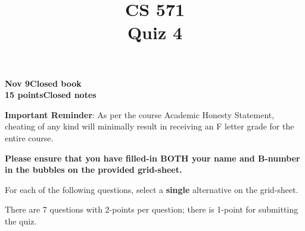 \documentclass[12pt]{article}
\title{CS 571\\Quiz 4}
\date{}
\begin{document}
\maketitle

\begin{flushleft}
\textbf{Nov 9}\hfill\textbf{Closed book}\\
\textbf{15 points}\hfill\textbf{Closed notes}\\

\vspace{0.5cm}

\textbf{Important Reminder}: As per the course Academic Honesty
Statement, cheating of any kind will minimally result in receiving an
F letter grade for the entire course.


\end{flushleft}

\textbf{Please ensure that you have filled-in BOTH your name and
  B-number in the bubbles on the provided grid-sheet.}

For each of the following questions, select a \textbf{single}
alternative on the grid-sheet.  

There are 7 questions with 2-points per question; there is 1-point
for submitting the quiz.
\end{document}
